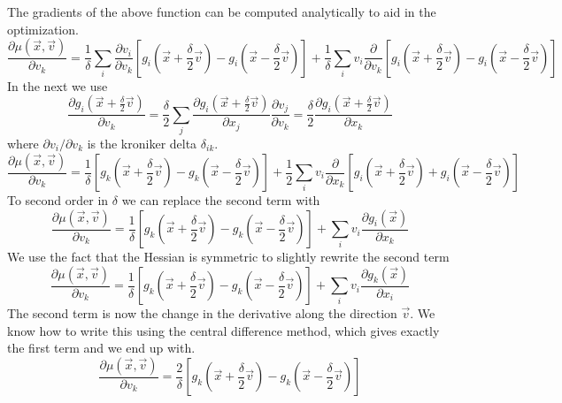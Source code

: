 \documentclass[a4paper]{article}
\begin{document}
The gradients of the above function can be computed analytically to aid in the
optimization.
\begin{equation}
\frac{\partial \mu(\vec{x}, \vec{v})} {\partial v_k} = 
\frac{1}{\delta} 
\sum_i \frac{\partial v_i}{\partial v_k}
\left[ g_i(\vec{x} + \frac{\delta}{2} \vec{v}) 
- g_i(\vec{x} - \frac{\delta}{2} \vec{v}) \right]
+
\frac{1}{ \delta} 
\sum_i v_i
\frac{\partial}{\partial v_k}
\left[ g_i(\vec{x} + \frac{\delta}{2} \vec{v}) 
- g_i(\vec{x} - \frac{\delta}{2} \vec{v}) \right]
\end{equation}
In the next we use
\begin{equation}
\frac{\partial g_i(\vec{x} + \frac{\delta}{2} \vec{v})}{ \partial v_k} 
= 
\frac{\delta}{2} \sum_j
\frac{\partial g_i(\vec{x} + \frac{\delta}{2} \vec{v})}{ \partial x_j}
\frac{\partial  v_j} { \partial v_k}
= \frac{\delta}{2} 
\frac{\partial g_i(\vec{x} + \frac{\delta}{2} \vec{v})}{ \partial x_k} 
\end{equation}
where $\partial v_i / \partial v_k$ is the kroniker delta $\delta_{ik}$.
\begin{equation}
\frac{\partial \mu(\vec{x}, \vec{v})} {\partial v_k} = 
\frac{1}{\delta} 
\left[ g_k(\vec{x} + \frac{\delta}{2} \vec{v}) 
- g_k(\vec{x} - \frac{\delta}{2} \vec{v}) \right]
+
\frac{1}{2} 
\sum_i v_i
\frac{\partial}{\partial x_k}
\left[ g_i(\vec{x} + \frac{\delta}{2} \vec{v}) 
+ g_i(\vec{x} - \frac{\delta}{2} \vec{v}) \right]
\end{equation}
To second order in $\delta$ we can replace the second term with
\begin{equation}
\frac{\partial \mu(\vec{x}, \vec{v})} {\partial v_k} = 
\frac{1}{\delta} 
\left[ g_k(\vec{x} + \frac{\delta}{2} \vec{v}) 
- g_k(\vec{x} - \frac{\delta}{2} \vec{v}) \right]
+
\sum_i v_i
\frac{\partial g_i(\vec{x})}{\partial x_k}
\end{equation}
We use the fact that the Hessian is
symmetric to slightly rewrite the second term
\begin{equation}
\frac{\partial \mu(\vec{x}, \vec{v})} {\partial v_k} = 
\frac{1}{\delta} 
\left[ g_k(\vec{x} + \frac{\delta}{2} \vec{v}) 
- g_k(\vec{x} - \frac{\delta}{2} \vec{v}) \right]
+
\sum_i v_i
\frac{\partial g_k(\vec{x})}{\partial x_i}
\end{equation}
The second term is now the change in the derivative along the direction
$\vec{v}$.  We know how to write this using the central difference method,
which gives exactly the first term and we end up with.
\begin{equation}
\frac{\partial \mu(\vec{x}, \vec{v})} {\partial v_k} = 
\frac{2}{\delta} 
\left[ g_k(\vec{x} + \frac{\delta}{2} \vec{v}) 
- g_k(\vec{x} - \frac{\delta}{2} \vec{v}) \right]
\end{equation}
\end{document}
